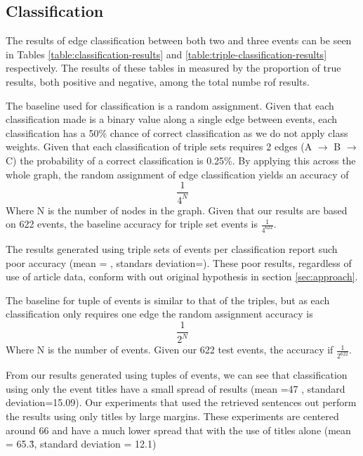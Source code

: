\documentclass[bsc,frontabs,twoside,singlespacing,parskip,deptreport]{infthesis}     %
\begin{document}
\subsection{Classification}
The results of edge classification between both two and three events can be seen in Tables \ref{table:classification-results}
and \ref{table:triple-classification-results} respectively. The results of these tables in measured by the
proportion of true results, both positive and negative, among the total numbe rof results.

The baseline used for classification is a random assignment.
Given that each classification made is a binary value along a single edge between events, each classification has a
50\% chance of correct classification as we do not apply class weights.
Given that each classification of triple sets requires 2 edges (A $\rightarrow$ B $\rightarrow$ C) the probability of a correct
classification is 0.25\%. By applying this across the whole graph, the random assignment of edge classification yields an
accuracy of
\begin{equation}
\frac{1}{4^N} \nonumber
\end{equation}
Where N is the number of nodes in the graph.
Given that our results are based on 622 events, the baseline accuracy for triple set events is $\frac{1}{4^{622}}$.

The results generated using triple sets of events per classification report such poor accuracy
(mean = , standars deviation=). These poor results, regardless of use of article data,
conform with out original hypothesis in section \ref{sec:approach}. 


The baseline for tuple of events is similar to that of the triples, but as each classification only requires one edge
the random assignment accuracy is
\begin{equation}
  \frac{1}{2^N}\nonumber
\end{equation}
Where N is the number of events.
Given our 622 test events, the accuracy if $\frac{1}{2^{622}}$.


From our results generated using tuples of events, we can see that classification using only the event titles
have a small spread of results (mean =47 , standard deviation=15.09).
Our experiments that used the retrieved sentences out perform the results using only titles by large margins.
These experiments are centered around 66 and have a much lower spread that with the use of titles alone
(mean = 65.\.{3}, standard deviation = 12.1)
\end{document}
